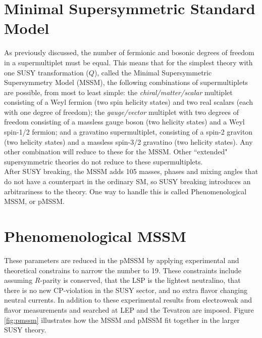 

\section{Minimal Supersymmetric Standard Model} %


As previously discussed, the number of fermionic and bosonic degrees of freedom in a supermultiplet must be equal.  This means that for the simplest theory with one SUSY transformation ($Q$), called the Minimal Supersymmetric Supersymmetry Model (MSSM)\cite{Djouadi:1998di}, the following combinations of supermultiplets are possible, from most to least simple: the \textit{chiral/matter/scalar} multiplet consisting of a Weyl fermion (two spin helicity states) and two real scalars (each with one degree of freedom); the \textit{gauge/vector} multiplet with two degrees of freedom consisting of a massless gauge boson (two helicity states) and a Weyl spin-1/2 fermion; and a gravatino supermultiplet, consisting of a spin-2 graviton (two helicity states) and a massless spin-3/2 gravatino (two helicity states).  Any other combination will reduce to these for the MSSM.  Other ``extended" supersymmetric theories do not reduce to these supermultiplets.  \\

After SUSY breaking, the MSSM adds 105 masses, phases and mixing angles that do not have a counterpart in the ordinary SM, so SUSY breaking introduces an arbitrariness to the theory.  One way to handle this is called Phenomenological MSSM, or pMSSM.


\section{Phenomenological MSSM}
\label{sec:pmssm}

These parameters are reduced in the pMSSM\cite{pMSSM} by applying experimental and theoretical constrains to narrow the number to 19.  These constraints include assuming $R$-parity is conserved, that the LSP is the lightest neutralino, that there is no new CP-violation in the SUSY sector, and no extra flavor changing neutral currents.  In addition to these experimental results from electroweak and flavor measurements and searched at LEP and the Tevatron are imposed.  Figure \ref{fig:pmssm} illustrates how the MSSM and pMSSM fit together in the larger SUSY theory. \\

